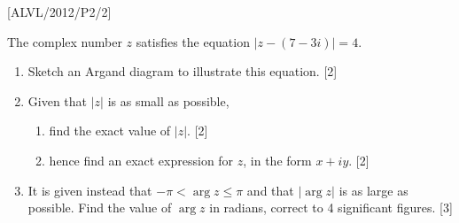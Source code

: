 \item {[}ALVL/2012/P2/2{]}

The complex number $z$ satisfies the equation $\left|z-(7-3i)\right|=4$. 
\begin{enumerate}
\item Sketch an Argand diagram to illustrate this equation. {[}2{]}
\item Given that $\left|z\right|$ is as small as possible,
\begin{enumerate}
\item find the exact value of $\left|z\right|$. {[}2{]} 
\item hence find an exact expression for $z$, in the form $x+iy$. {[}2{]}
\end{enumerate}
\item It is given instead that $-\pi<\arg z\le\pi$ and that $\left|\arg z\right|$
is as large as possible. Find the value of $\arg z$ in radians, correct
to 4 significant figures. {[}3{]}
\end{enumerate}
